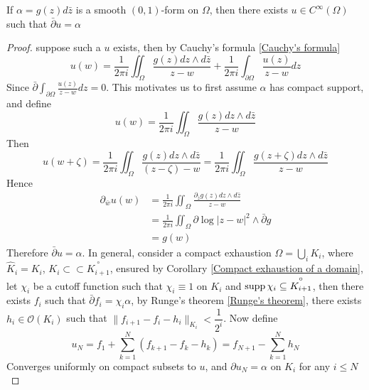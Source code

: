 \documentclass[../main.tex]{subfiles}
\begin{document}
\begin{theorem}\label{d bar theorem}
If $\alpha=g(z)d\bar z$ is a smooth $(0,1)$-form on $\Omega$, then there exists $u\in C^\infty(\Omega)$ such that $\bar\partial u=\alpha$
\end{theorem}

\begin{proof}
suppose such a $u$ exists, then by Cauchy's formula \ref{Cauchy's formula}
\[u(w)=\frac{1}{2\pi i}\iint_{\Omega}\frac{g(z) dz\wedge d\bar z}{z-w}+\frac{1}{2\pi i}\int_{\partial \Omega}\frac{u(z)}{z-w}dz\]
Since $\bar\partial\displaystyle\int_{\partial \Omega}\frac{u(z)}{z-w}dz=0$. This motivates us to first assume $\alpha$ has compact support, and define
\[u(w)=\frac{1}{2\pi i}\iint_{\Omega}\frac{ g(z)dz\wedge d\bar z}{z-w}\]
Then
\[u(w+\zeta)=\frac{1}{2\pi i}\iint_{\Omega}\frac{g(z)dz\wedge d\bar z}{(z-\zeta)-w}=\frac{1}{2\pi i}\iint_{\Omega}\frac{g(z+\zeta)dz\wedge d\bar z}{z-w}\]
Hence
\begin{align*}
\partial_{\bar w} u(w)&=\frac{1}{2\pi i}\iint_{\Omega}\frac{\partial_{\bar z} g(z)dz\wedge d\bar z}{z-w} \\
&=\frac{1}{2\pi i}\iint_{\Omega}\partial \log|z-w|^2\wedge\bar\partial g \\
&=g(w)
\end{align*}
Therefore $\bar\partial u=\alpha$. In general, consider a compact exhaustion $\Omega=\displaystyle\bigcup_{i}K_i$, where $\hat K_i= K_i$, $K_i\subset\subset\overset{\circ}{K_{i+1}}$, ensured by Corollary \ref{Compact exhaustion of a domain}, let $\chi_i$ be a cutoff function such that $\chi_i\equiv1$ on $K_i$ and $\operatorname{supp}\chi_i\subseteq\overset{\circ}{K_{i+1}}$, then there exists $f_i$ such that $\bar\partial f_i=\chi_i\alpha$, by Runge's theorem \ref{Runge's theorem}, there exists $h_i\in\mathcal O(K_i)$ such that $\|f_{i+1}-f_i-h_i\|_{K_i}<\dfrac{1}{2^i}$. Now define
\[ u_N=f_1+\sum_{k=1}^{N}(f_{k+1}-f_k-h_k)=f_{N+1}-\sum_{k=1}^{N}h_N\]
Converges uniformly on compact subsets to $u$, and $\partial u_N=\alpha$ on $K_i$ for any $i\leq N$
\end{proof}
\end{document}
